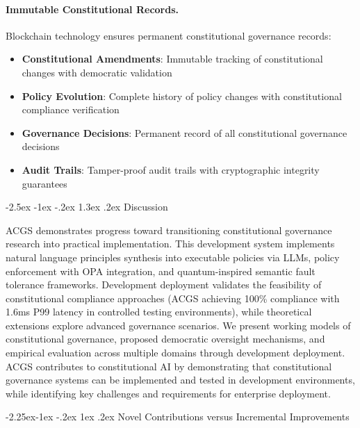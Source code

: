 \documentclass[manuscript,screen,9pt]{acmart}
\makeatletter
\renewcommand\section{\@startsection{section}{1}{\z@}%
  {-2.5ex \@plus -1ex \@minus -.2ex}%
  {1.3ex \@plus.2ex}%
  {\normalfont\Large\bfseries}}
\renewcommand\subsection{\@startsection{subsection}{2}{\z@}%
  {-2.25ex\@plus -1ex \@minus -.2ex}%
  {1ex \@plus .2ex}%
  {\normalfont\large\bfseries}}
\makeatother
\begin{document}
\paragraph{Immutable Constitutional Records.} Blockchain technology ensures permanent constitutional governance records:
\begin{itemize}[itemsep=1pt,parsep=1pt]
    \item \textbf{Constitutional Amendments}: Immutable tracking of constitutional changes with democratic validation
    \item \textbf{Policy Evolution}: Complete history of policy changes with constitutional compliance verification
    \item \textbf{Governance Decisions}: Permanent record of all constitutional governance decisions
    \item \textbf{Audit Trails}: Tamper-proof audit trails with cryptographic integrity guarantees
\end{itemize}

\section{Discussion}
\label{sec:discussion}

ACGS demonstrates progress toward transitioning constitutional governance research into practical implementation. This development system implements natural language principles synthesis into executable policies via LLMs, policy enforcement with OPA integration, and quantum-inspired semantic fault tolerance frameworks. Development deployment validates the feasibility of constitutional compliance approaches (ACGS achieving 100\% compliance with 1.6ms P99 latency in controlled testing environments), while theoretical extensions explore advanced governance scenarios. We present working models of constitutional governance, proposed democratic oversight mechanisms, and empirical evaluation across multiple domains through development deployment. ACGS contributes to constitutional AI by demonstrating that constitutional governance systems can be implemented and tested in development environments, while identifying key challenges and requirements for enterprise deployment.

\subsection{Novel Contributions versus Incremental Improvements}
\label{subsec:novel_contributions}
\end{document}
